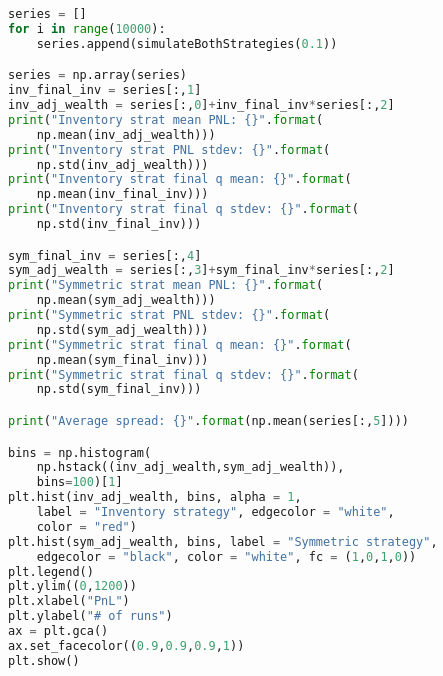 \begin{lstlisting}[language=Python, caption=Run and report results]
series = []
for i in range(10000):
    series.append(simulateBothStrategies(0.1))

series = np.array(series)
inv_final_inv = series[:,1]
inv_adj_wealth = series[:,0]+inv_final_inv*series[:,2]
print("Inventory strat mean PNL: {}".format(
    np.mean(inv_adj_wealth)))
print("Inventory strat PNL stdev: {}".format(
    np.std(inv_adj_wealth)))
print("Inventory strat final q mean: {}".format(
    np.mean(inv_final_inv)))
print("Inventory strat final q stdev: {}".format(
    np.std(inv_final_inv)))

sym_final_inv = series[:,4]
sym_adj_wealth = series[:,3]+sym_final_inv*series[:,2]
print("Symmetric strat mean PNL: {}".format(
    np.mean(sym_adj_wealth)))
print("Symmetric strat PNL stdev: {}".format(
    np.std(sym_adj_wealth)))
print("Symmetric strat final q mean: {}".format(
    np.mean(sym_final_inv)))
print("Symmetric strat final q stdev: {}".format(
    np.std(sym_final_inv)))

print("Average spread: {}".format(np.mean(series[:,5])))

bins = np.histogram(
    np.hstack((inv_adj_wealth,sym_adj_wealth)), 
    bins=100)[1] 
plt.hist(inv_adj_wealth, bins, alpha = 1, 
    label = "Inventory strategy", edgecolor = "white", 
    color = "red")
plt.hist(sym_adj_wealth, bins, label = "Symmetric strategy", 
    edgecolor = "black", color = "white", fc = (1,0,1,0))
plt.legend()
plt.ylim((0,1200))
plt.xlabel("PnL")
plt.ylabel("# of runs")
ax = plt.gca()
ax.set_facecolor((0.9,0.9,0.9,1))
plt.show()
\end{lstlisting}
